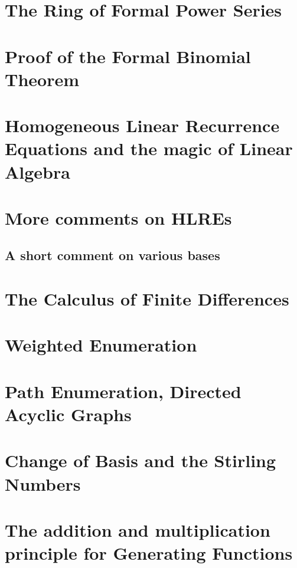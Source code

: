 




\section{The Ring of Formal Power Series}

\section{Proof of the Formal Binomial Theorem}



\section{Homogeneous Linear Recurrence Equations and the magic of Linear Algebra}

\section{More comments on HLREs}

\subsection{A short comment on various bases}

\section{The Calculus of Finite Differences}

\section{Weighted Enumeration}

\section{Path Enumeration, Directed Acyclic Graphs}

\section{Change of Basis and the Stirling Numbers}

\section{The addition and multiplication principle for Generating Functions}

